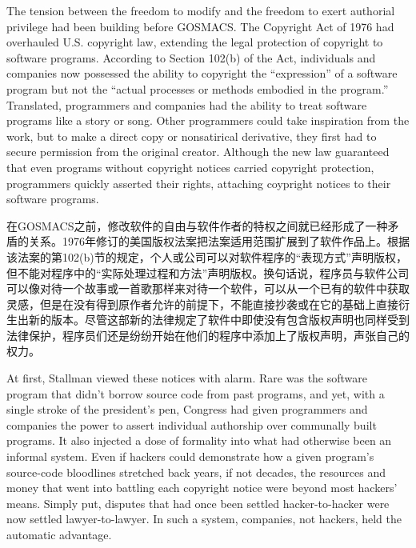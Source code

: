\ifdefined\eng
The tension between the freedom to modify and the freedom to exert authorial privilege had been building before GOSMACS. The Copyright Act of 1976 had overhauled U.S. copyright law, extending the legal protection of copyright to software programs. According to Section 102(b) of the Act, individuals and companies now possessed the ability to copyright the ``expression'' of a software program but not the ``actual processes or methods embodied in the program.'' Translated, programmers and companies had the ability to treat software programs like a story or song. Other programmers could take inspiration from the work, but to make a direct copy or nonsatirical derivative, they first had to secure permission from the original creator. Although the new law guaranteed that even programs without copyright notices carried copyright protection, programmers quickly asserted their rights, attaching coypright notices to their software programs.
\fi

\ifdefined\chs
在GOSMACS之前，修改软件的自由与软件作者的特权之间就已经形成了一种矛盾的关系。1976年修订的美国版权法案把法案适用范围扩展到了软件作品上。根据该法案的第102(b)节的规定，个人或公司可以对软件程序的``表现方式''声明版权，但不能对程序中的``实际处理过程和方法''声明版权。换句话说，程序员与软件公司可以像对待一个故事或一首歌那样来对待一个软件，可以从一个已有的软件中获取灵感，但是在没有得到原作者允许的前提下，不能直接抄袭或在它的基础上直接衍生出新的版本。尽管这部新的法律规定了软件中即使没有包含版权声明也同样受到法律保护，程序员们还是纷纷开始在他们的程序中添加上了版权声明，声张自己的权力。
\fi

\ifdefined\eng
At first, Stallman viewed these notices with alarm. Rare was the software program that didn't borrow source code from past programs, and yet, with a single stroke of the president's pen, Congress had given programmers and companies the power to assert individual authorship over communally built programs. It also injected a dose of formality into what had otherwise been an informal system. Even if hackers could demonstrate how a given program's source-code bloodlines stretched back years, if not decades, the resources and money that went into battling each copyright notice were beyond most hackers' means. Simply put, disputes that had once been settled hacker-to-hacker were now settled lawyer-to-lawyer. In such a system, companies, not hackers, held the automatic advantage.
\fi

